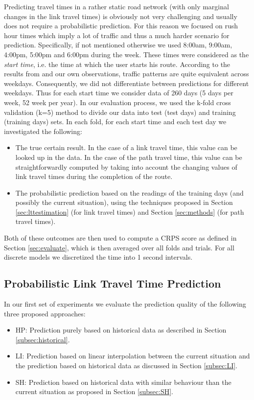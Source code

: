 Predicting travel times in a rather static road network (with only marginal
changes in the link travel times) is obviously not very challenging and usually does not require a probabilistic prediction. For this reason we focused on rush hour times which imply a lot of traffic and thus a much harder scenario for prediction. Specifically, if not mentioned otherwise we used 8:00am, 9:00am, 4:00pm, 5:00pm and 6:00pm during the week. These times were considered as the \textit{start time}, i.e. the time at which the user starts his route.
According to the results from \cite{Pan12} and our own observations, traffic patterns are quite equivalent across weekdays. Consequently, we did not differentiate between predictions for different weekdays. Thus for each start time we consider data of 260 days (5 days per week, 52 week per year). In our evaluation process, we used the k-fold cross validation (k=5) method to divide our data into test (test days) and training (training days) sets. In each fold, for each start time and each test day we investigated the following:
\begin{itemize}
  \item The true certain result. In the case of a link travel time, this
  value can be looked up in the data. In the case of the path travel time, this
  value can be straightforwardly computed by taking into account the changing values
  of link travel times during the completion of the route.
  \item The probabilistic prediction based on the readings of the training days
  (and possibly the current situation), using the techniques proposed in Section
  \ref{sec:lttestimation} (for link travel times) and Section \ref{sec:methods}
  (for path travel times).
\end{itemize}
Both of these outcomes are then used to compute a CRPS score as defined
in Section \ref{sec:evaluate}, which is then averaged over all folds and trials.
For all discrete models we discretized the time into 1 second intervals.

\subsection{Probabilistic Link Travel Time Prediction}
In our first set of experiments we evaluate the prediction quality of
the following three proposed approaches:
\begin{itemize}
  \item HP: Prediction purely based on historical data as described in Section
  \ref{subsec:historical}.
  \item LI: Prediction based on linear interpolation between the current
  situation and the prediction based on historical data as discussed in Section
  \ref{subsec:LI}.
  \item SH: Prediction based on historical data with similar behaviour than the
  current situation as proposed in Section \ref{subsec:SH}.
\end{itemize}

